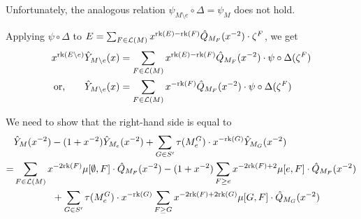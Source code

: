 \documentclass[11pt]{article}
\newcommand{\calL}{\mathcal{L}}
\newcommand{\rank}{\normalfont\text{rk}}
\theoremstyle{remark}
\begin{document}
Unfortunately, the analogous relation $\psi_{M\setminus e} \circ \Delta = \psi_M$ does not hold.

Applying $\psi\circ\Delta$ to $E = \sum_{F \in \calL(M)} x^{\rank(E)-\rank(F)}\hat{Q}_{M_F}(x^{-2})\cdot \zeta^F$, we get
\begin{align*}
    x^{\rank(E\setminus e)}\hat{Y}_{M\setminus e}(x) & = \sum_{F \in \calL(M)} x^{\rank(E)-\rank(F)}\hat{Q}_{M_F}(x^{-2})\cdot \psi\circ\Delta(\zeta^F) \\
    \text{or,} \qquad \hat{Y}_{M\setminus e}(x)      & = \sum_{F \in \calL(M)} x^{-\rank(F)}\hat{Q}_{M_F}(x^{-2})\cdot \psi\circ\Delta(\zeta^F)         \\
\end{align*}

We need to show that the right-hand side is equal to
\begin{align*}
      & \hat{Y}_M(x^{-2}) - (1+x^{-2})\hat{Y}_{M_e}(x^{-2}) + \sum_{G \in S'} \tau(M^G_e)\cdot x^{-\rank(G)}\hat{Y}_{M_G}(x^{-2})                                      \\
    = & \sum_{F \in \calL(M)} x^{-2\rank(F)}\mu[\emptyset,F]\cdot\hat{Q}_{M_F}(x^{-2}) - (1+x^{-2})\sum_{F\geq e} x^{-2\rank(F) + 2}\mu[e,F]\cdot\hat{Q}_{M_F}(x^{-2}) \\
      & \qquad \qquad+ \sum_{G \in S'} \tau(M^G_e)\cdot x^{-\rank(G)}\sum_{F \geq G} x^{-2\rank(F) + 2\rank(G)}\mu[G,F]\cdot\hat{Q}_{M_G}(x^{-2})
\end{align*}
\end{document}
